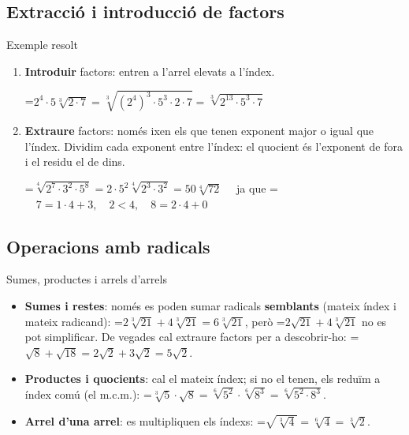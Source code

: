 \documentclass[11pt,a4paper]{article}
\newcommand{\lt}{<}\newcommand{\gt}{>}
\newcommand{\fmm}[1]{\setbox0=\hbox{$#1$}\ifdim\wd0>\linewidth\fmdisp{#1}\else\mbox{\box0}\fi}
\newcommand{\fmdisp}[1]{\[\setbox2=\hbox{$\displaystyle #1$}\ifdim\wd2>\linewidth\resizebox{\linewidth}{!}{\box2}\else\box2\fi\]}
\begin{document}
\subsection*{Extracció i introducció de factors}
\begin{fmex}{Exemple resolt}
\begin{enumerate}[label=\textbf{\arabic*.},leftmargin=*]
\item \textbf{Introduir} factors: entren a l'arrel elevats a l'índex.

\fmm{2^4\cdot 5\sqrt[3]{2\cdot 7}=\sqrt[3]{(2^4)^3\cdot 5^3\cdot 2\cdot 7}=\sqrt[3]{2^{13}\cdot 5^3\cdot 7}}
\item \textbf{Extraure} factors: només ixen els que tenen exponent major o igual que l'índex. Dividim cada exponent entre l'índex: el quocient és l'exponent de fora i el residu el de dins.

\fmm{\sqrt[4]{2^7\cdot 3^2\cdot 5^8}=2\cdot 5^2\sqrt[4]{2^3\cdot 3^2}=50\sqrt[4]{72}} \,\,\,\,\,\,ja que  \fmm{\quad 7=1\cdot4+3,\quad 2\lt4,\quad 8=2\cdot4+0}
\end{enumerate}
\end{fmex}

\subsection*{Operacions amb radicals}
\begin{fmdef}{Sumes, productes i arrels d'arrels}
\begin{itemize}
\item \textbf{Sumes i restes}: només es poden sumar radicals \textbf{semblants} (mateix índex i mateix radicand): \fmm{2\sqrt[3]{21}+4\sqrt[3]{21}=6\sqrt[3]{21}}, però \fmm{2\sqrt{21}+4\sqrt[3]{21}} no es pot simplificar. De vegades cal extraure factors per a descobrir-ho: \fmm{\sqrt8+\sqrt{18}=2\sqrt2+3\sqrt2=5\sqrt2}.
\item \textbf{Productes i quocients}: cal el mateix índex; si no el tenen, els reduïm a índex comú (el m.c.m.): \fmm{\sqrt[3]{5}\cdot\sqrt8=\sqrt[6]{5^2}\cdot\sqrt[6]{8^3}=\sqrt[6]{5^2\cdot8^3}}.
\item \textbf{Arrel d'una arrel}: es multipliquen els índexs: \fmm{\sqrt{\sqrt[3]{4}}=\sqrt[6]{4}=\sqrt[3]{2}}.
\end{itemize}
\end{fmdef}

\end{document}
